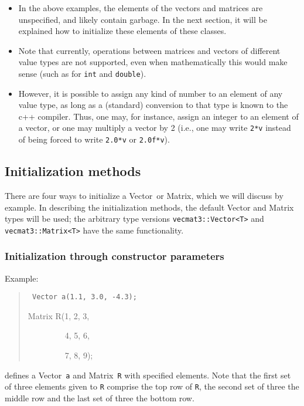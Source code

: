 \documentclass[12pt,twoside]{article}
\newcommand{\Vector}{{Vector}}
\newcommand{\Matrix}{{Matrix}}
\newcommand{\TT}{{\tt<}T{\tt>}}
\begin{document}
\begin{itemize}
      \item In the above examples, the elements of the vectors and
        matrices are unspecified, and likely contain garbage. In the
        next section, it will be explained how to initialize these
        elements of these
        classes.
    \item Note that currently, operations between matrices and vectors
      of different value types are not supported, even when mathematically
      this would make sense (such as for \texttt{int} and
      \texttt{double}). 
      \item However, it is possible to assign any kind of number to an
        element of any value type, as long as a (standard)
        conversion to that type is known to the c++ compiler.  Thus,
        one may, for instance, assign an integer to an element of a
        vector, or one may multiply a vector by 2 (i.e., one may write
        \texttt{2*v} instead of being
        forced to write \texttt{2.0*v} or \texttt{2.0f*v}).
\end{itemize}


\subsection{Initialization methods}

There are four ways to initialize a \Vector\ or \Matrix, which we will
discuss by example.  In describing the initialization methods, the
default Vector and Matrix types will be used; the arbitrary type
versions \texttt{vecmat3::Vector\TT{}} and
\texttt{vecmat3::Matrix\TT{}} have the same functionality.

\subsubsection{Initialization through constructor parameters}
  Example:
    \begin{quote}\tt
         Vector a(1.1, 3.0, -4.3);

         Matrix R(1, 2, 3,
 
\ \ \ \ \ \ \ \ \ 4, 5, 6,

\ \ \ \ \ \ \ \ \ 7, 8, 9);
    \end{quote}
    defines a \Vector\ \texttt a and \Matrix\ \texttt R with specified
    elements. Note that the first set of three elements given to
    \texttt R comprise the top row of \texttt R, the second set of
    three the middle row and the last set of three the bottom row.
\end{document}
